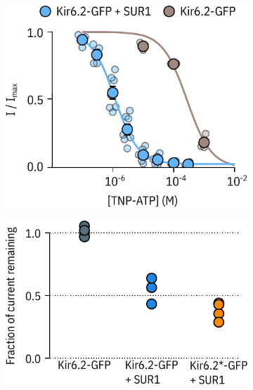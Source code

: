 \begin{figure}[h]
	\centering
	\begin{subfigure}[t]{0.45\textwidth}
		\caption{}\label{ch6fig:nosur_patch}
		\centering
		\includegraphics[width=\textwidth]{nosur_patch.pdf}
	\end{subfigure}
	\hfill
	\begin{subfigure}[t]{0.45\textwidth}
		\caption{}\label{ch6fig:tolb_inhibition_1}
		\centering
		\includegraphics[width=\textwidth]{tolb_inhibition_1.pdf}
	\end{subfigure}
	\vfill
	\begin{subfigure}[t]{0.45\textwidth}
		\caption{}\label{ch6fig:nosur_unroofed}
		\centering

\end{subfigure}
\end{figure}
